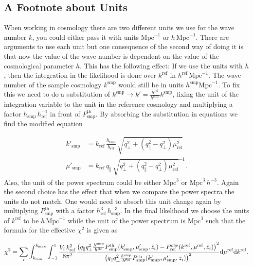\documentclass[../main.tex]{subfiles}
\begin{document}
\subsection*{A Footnote about Units} 
When working in cosmology there are two different units we use for the wave number $k$, you could either pass it with units $\mathrm{Mpc}^{-1}$ or $h\,\mathrm{Mpc}^{-1}$. There are arguments to use each unit but one consequence of the second way of doing it is that now the value of the wave number is dependent on the value of the cosmological parameter $h$. This has the following effect: If we use the units with $h$, then the integration in the likelihood is done over $k^\mathrm{ref}$ in $h^\mathrm{ref} \,\mathrm{Mpc}^{-1}$. The wave number of the sample cosmology $k^\mathrm{smp}$ would still be in units $h^\mathrm{smp} \mathrm{Mpc}^{-1}$. To fix this we need to do a substitution of $k^\mathrm{smp}\to k' = \frac{h^\mathrm{ref}}{h^\mathrm{smp}} k^\mathrm{smp}$,  fixing the unit of the integration variable to the unit in the reference cosmology and multiplying a factor $h_\mathrm{smp}\,h_\mathrm{ref}^{-1}$ in front of $P^\mathrm{th}_\mathrm{smp}$. By absorbing  the substitution in equations  we find the modified equation 

 \begin{align*}
    k'_\mathrm{smp} &= k_\mathrm{ref}\,\frac{h_\mathrm{smp}}{h_\mathrm{ref}}\,\sqrt{q^2_\perp + \left(q_\|^2-q_\perp^2\right)\mu_\mathrm{ref}^2} \\
    \mu'_\mathrm{smp} &= k_\mathrm{ref}\, q_\|\,\sqrt{q^2_\perp + \left(q_\|^2-q_\perp^2\right)\mu_\mathrm{ref}^2}^{-1}.
 \end{align*}
Also, the unit of the power spectrum could be either $\mathrm{Mpc}^3$ or $\mathrm{Mpc}^3\, h^{-3}$. Again the second choice has the effect that when we compare the power spectra the units
do not match. One would need to absorb this unit change again by multiplying $P^\mathrm{th}_\mathrm{smp}$ with a factor $h_\mathrm{ref}^3\,h_\mathrm{smp}^{-3}$. In the final likelihood we choose the units of $k^\mathrm{ref}$ to be $h\, \mathrm{Mpc}^{-1}$ while the unit of the power spectrum is $\mathrm{Mpc}^3$ such that the formula for the effective $\chi^2$ is given as 

\begin{equation}
   \chi^2 = \sum_i \int_{k_\mathrm{min}}^{k_\mathrm{max}} \int_{-1}^{1} \frac{V_i\, k_\mathrm{ref}^2 }{8 \pi^2} 
    \frac{\left( q_\| q_\perp^2 \frac{h^\mathrm{smp}}{h^\mathrm{fid}} P^\mathrm{th}_\mathrm{smp}(k'_\mathrm{smp}, \mu'_\mathrm{smp},\bar{z}_i)
    -P_\mathrm{ref}^\mathrm{obs}(k^\mathrm{ref},\mu^\mathrm{ref},\bar{z}_i)\right)^2}
    {\left(  q_\| q_\perp^2 \frac{h^\mathrm{smp}}{h^\mathrm{fid}} P^\mathrm{th}_\mathrm{smp}(k'_\mathrm{smp}, \mu'_\mathrm{smp},\bar{z}_i) \right)^2} \mathrm{d} \mu^\mathrm{ref} \mathrm{d} k^\mathrm{ref}.
\end{equation}  
\end{document}
